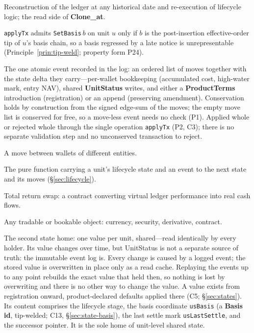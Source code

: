 \documentclass[11pt,a4paper]{article}
\begin{document}
\begin{description}[style=nextline]
\item[Time travel] Reconstruction of the ledger at any historical date and re-execution of lifecycle logic; the read side of \textbf{Clone\_at}.

\item[Tip weld] \texttt{applyTx} admits \texttt{SetBasis}\,$b$ on unit $u$ only if $b$ is the post-insertion effective-order tip of $u$'s basis chain, so a basis regressed by a late notice is unrepresentable (Principle~\ref{prin:tip-weld}; property form P24).

\item[Transaction] The one atomic event recorded in the log: an ordered list of moves together with the state delta they carry---per-wallet bookkeeping (accumulated cost, high-water mark, entry NAV), shared \textbf{UnitStatus} writes, and either a \textbf{ProductTerms} introduction (registration) or an append (preserving amendment). Conservation holds by construction from the signed edge-sum of the moves; the empty move list is conserved for free, so a move-less event needs no check (P1). Applied whole or rejected whole through the single operation \texttt{applyTx} (P2, C3); there is no separate validation step and no unconserved transaction to reject.

\item[Transfer] A move between wallets of different entities.

\item[Transition function] The pure function carrying a unit's lifecycle state and an event to the next state and its moves (\S\ref{sec:lifecycle}).

\item[TRS] Total return swap: a contract converting virtual ledger performance into real cash flows.

\item[Unit] Any tradable or bookable object: currency, security, derivative, contract.

\item[UnitStatus] The second state home: one value per unit, shared---read identically by every holder. Its value changes over time, but UnitStatus is not a separate source of truth: the immutable event log is. Every change is caused by a logged event; the stored value is overwritten in place only as a read cache. Replaying the events up to any point rebuilds the exact value that held then, so nothing is lost by overwriting and there is no other way to change the value. A value exists from registration onward, product-declared defaults applied there (C5; \S\ref{sec:states}). Its content comprises the lifecycle stage, the basis coordinate \texttt{usBasis} (a \textbf{Basis id}, tip-welded; C13, \S\ref{sec:state-basis}), the last settle mark \texttt{usLastSettle}, and the successor pointer. It is the sole home of unit-level shared state.


\end{description}
\end{document}
